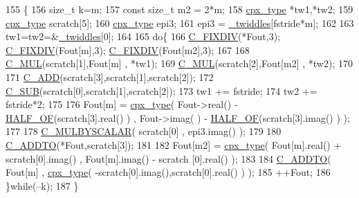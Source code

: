 \begin{DoxyCode}
155         \{
156             \textcolor{keywordtype}{size\_t} k=m;
157             \textcolor{keyword}{const} \textcolor{keywordtype}{size\_t} m2 = 2*m;
158             \hyperlink{classkissfft_af66664488b0b1b2995f3e4c2f63a8b7d}{cpx\_type} *tw1,*tw2;
159             \hyperlink{classkissfft_af66664488b0b1b2995f3e4c2f63a8b7d}{cpx\_type} scratch[5];
160             \hyperlink{classkissfft_af66664488b0b1b2995f3e4c2f63a8b7d}{cpx\_type} epi3;
161             epi3 = \hyperlink{classkissfft_abd5d6e3a0d08f56c711590d890fdd740}{\_twiddles}[fstride*m];
162 
163             tw1=tw2=&\hyperlink{classkissfft_abd5d6e3a0d08f56c711590d890fdd740}{\_twiddles}[0];
164 
165             \textcolor{keywordflow}{do}\{
166                 \hyperlink{classkissfft_aef8eb1d4326ae5c6a94ad71af0af87c5}{C\_FIXDIV}(*Fout,3); \hyperlink{classkissfft_aef8eb1d4326ae5c6a94ad71af0af87c5}{C\_FIXDIV}(Fout[m],3); \hyperlink{classkissfft_aef8eb1d4326ae5c6a94ad71af0af87c5}{C\_FIXDIV}(Fout[m2],3);
167 
168                 \hyperlink{classkissfft_afa4efc3959abe6bb1e4c10f4442fed07}{C\_MUL}(scratch[1],Fout[m] , *tw1);
169                 \hyperlink{classkissfft_afa4efc3959abe6bb1e4c10f4442fed07}{C\_MUL}(scratch[2],Fout[m2] , *tw2);
170 
171                 \hyperlink{classkissfft_a4f053d9dbac7e4c7c8594b01eca50511}{C\_ADD}(scratch[3],scratch[1],scratch[2]);
172                 \hyperlink{classkissfft_a1f4a4ec1b1ac1f2b199710b921b53a6d}{C\_SUB}(scratch[0],scratch[1],scratch[2]);
173                 tw1 += fstride;
174                 tw2 += fstride*2;
175 
176                 Fout[m] = \hyperlink{classkissfft_af66664488b0b1b2995f3e4c2f63a8b7d}{cpx\_type}( Fout->real() - \hyperlink{classkissfft_aca22ce3dafcd91ffca189121367fd026}{HALF\_OF}(scratch[3].real() ) , Fout->imag(
      ) - \hyperlink{classkissfft_aca22ce3dafcd91ffca189121367fd026}{HALF\_OF}(scratch[3].imag() ) );
177 
178                 \hyperlink{classkissfft_a25bc023cec82dce6d314dea8c124349a}{C\_MULBYSCALAR}( scratch[0] , epi3.imag() );
179 
180                 \hyperlink{classkissfft_a1cb327491bc3dce979631f5c2ebd142a}{C\_ADDTO}(*Fout,scratch[3]);
181 
182                 Fout[m2] = \hyperlink{classkissfft_af66664488b0b1b2995f3e4c2f63a8b7d}{cpx\_type}(  Fout[m].real() + scratch[0].imag() , Fout[m].imag() - scratch
      [0].real() );
183 
184                 \hyperlink{classkissfft_a1cb327491bc3dce979631f5c2ebd142a}{C\_ADDTO}( Fout[m] , \hyperlink{classkissfft_af66664488b0b1b2995f3e4c2f63a8b7d}{cpx\_type}( -scratch[0].imag(),scratch[0].real() ) );
185                 ++Fout;
186             \}\textcolor{keywordflow}{while}(--k);
187         \}
\end{DoxyCode}

